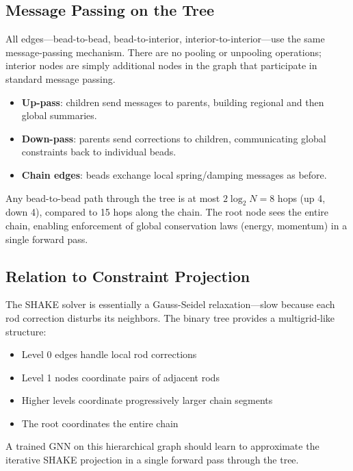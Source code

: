 \documentclass[11pt,a4paper]{article}
\begin{document}
\subsection{Message Passing on the Tree}

All edges---bead-to-bead, bead-to-interior, interior-to-interior---use the
same message-passing mechanism. There are no pooling or unpooling operations;
interior nodes are simply additional nodes in the graph that participate in
standard message passing.

\begin{itemize}
    \item \textbf{Up-pass}: children send messages to parents, building
          regional and then global summaries.
    \item \textbf{Down-pass}: parents send corrections to children,
          communicating global constraints back to individual beads.
    \item \textbf{Chain edges}: beads exchange local spring/damping messages
          as before.
\end{itemize}

Any bead-to-bead path through the tree is at most $2 \log_2 N = 8$ hops
(up 4, down 4), compared to 15 hops along the chain. The root node sees the
entire chain, enabling enforcement of global conservation laws (energy,
momentum) in a single forward pass.

\subsection{Relation to Constraint Projection}

The SHAKE solver is essentially a Gauss-Seidel relaxation---slow because each
rod correction disturbs its neighbors. The binary tree provides a
multigrid-like structure:
\begin{itemize}
    \item Level 0 edges handle local rod corrections
    \item Level 1 nodes coordinate pairs of adjacent rods
    \item Higher levels coordinate progressively larger chain segments
    \item The root coordinates the entire chain
\end{itemize}

A trained GNN on this hierarchical graph should learn to approximate the
iterative SHAKE projection in a single forward pass through the tree.
\end{document}
